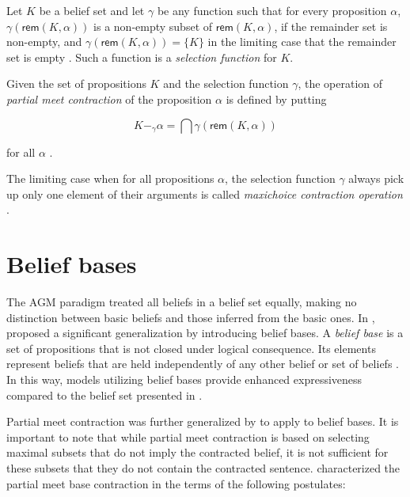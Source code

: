 \begin{definition}
    Let $K$ be a belief set and let $\gamma$ be any function such that for every proposition $\alpha$, $\gamma(\textsf{rem}(K, \alpha))$ is a non-empty subset of $\textsf{rem}(K, \alpha)$, if the remainder set is non-empty, and $\gamma(\textsf{rem}(K, \alpha)) = \{ K \}$ in the limiting case that the remainder set is empty \citep{AGM1985}. Such a function is a \textit{selection function} for $K$.
\end{definition}

\begin{definition}
    Given the set of propositions $K$ and the selection function $\gamma$, the operation of \textit{partial meet contraction} of the proposition $\alpha$ is defined by putting

    $$K -_{\gamma} \alpha = \bigcap \gamma(\textsf{rem}(K, \alpha))$$

    for all $\alpha$ \citep{AGM1985}.
\end{definition}

\begin{definition}
    The limiting case when for all propositions $\alpha$, the selection function $\gamma$ always pick up only one element of their arguments is called \textit{maxichoice contraction operation} \citep{AGM1985}.
\end{definition}

\section{Belief bases}

The AGM paradigm treated all beliefs in a belief set equally, making no distinction between basic beliefs and those inferred from the basic ones. In \citet{Hansson1993}, \citeauthor{Hansson1993} proposed a significant generalization by introducing belief bases. A \textit{belief base} is a set of propositions that is not closed under logical consequence. Its elements represent beliefs that are held independently of any other belief or set of beliefs \citep{Hansson2022}. In this way, models utilizing belief bases provide enhanced expressiveness compared to the belief set presented in \citet{AGM1985}.

Partial meet contraction was further generalized by \citeauthor{Hansson1993} to apply to belief bases. It is important to note that while partial meet contraction is based on selecting maximal subsets that do not imply the contracted belief, it is not sufficient for these subsets that they do not contain the contracted sentence. \citeauthor{Hansson1993} characterized the partial meet base contraction in the terms of the following postulates:

